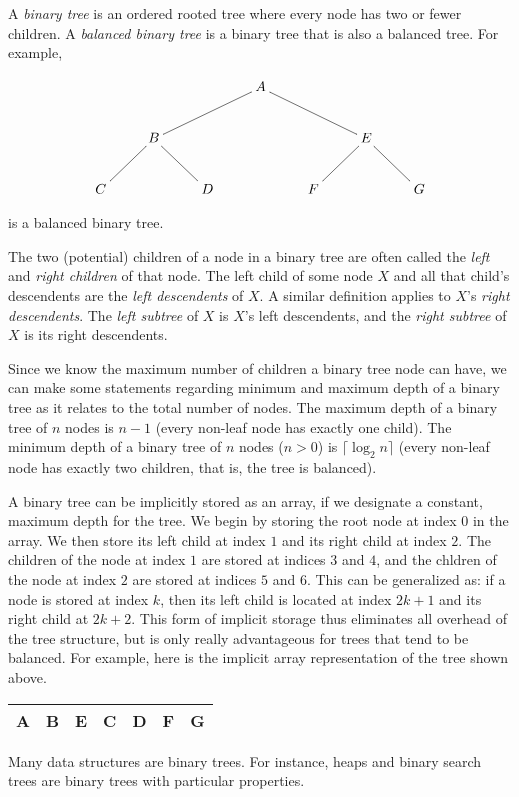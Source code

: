 \documentclass[12pt]{article}
\begin{document}
A \emph{binary tree} is an ordered rooted tree where every node has two or fewer children.  A \emph{balanced binary tree} is a binary tree that is also a balanced tree.
For example,

$$
\xymatrix{
&&&A \ar@{-}[dll] \ar@{-}[drr] \\
&B \ar@{-}[dl] \ar@{-}[dr] &&&& E \ar@{-}[dl] \ar@{-}[dr] \\
C && D && F && G
}
$$

is a balanced binary tree.

The two (potential) children of a node in a binary tree are often called the
\emph{left} and \emph{right children} of that node.  The left child of some node $X$ and all that child's descendents are the \emph{left descendents} of $X$.  A similar definition applies to $X$'s \emph{right descendents}.  The \emph{left subtree} of $X$ is $X$'s left descendents, and the \emph{right subtree} of $X$ is its right descendents.

Since we know the maximum number of children a binary tree node can have, we can make some statements regarding minimum and maximum depth of a binary tree as it relates to the total number of nodes.  The maximum depth of a binary tree of $n$ nodes is $n - 1$ (every non-leaf node has exactly one child).  The minimum depth of a binary tree of $n$ nodes ($n > 0$) is $\lceil\log_2n\rceil$ (every non-leaf node has exactly two children, that is, the tree is balanced).

A binary tree can be implicitly stored as an array, if we designate a constant, maximum depth for the tree.  We begin by storing the root node at index $0$ in the array.  We then store its left child at index $1$ and its right child at index $2$.  The children of the node at index $1$ are stored at indices $3$ and $4$, and the chldren of the node at index $2$ are stored at indices $5$ and $6$.
This can be generalized as: if a node is stored at index $k$, then its left child is located at index $2k+1$ and its right child at $2k+2$.  This form of implicit storage thus eliminates all overhead of the tree structure, but is only really advantageous for trees that tend to be balanced.  For example, here is the implicit array representation of the tree shown above.

\begin{center}
\begin{tabular}{|*{7}{c|}}
\hline
A&B&E&C&D&F&G\\
\hline
\end{tabular}
\end{center}

Many data structures are binary trees.  For instance, heaps and binary search trees are binary trees with particular properties.
\end{document}
